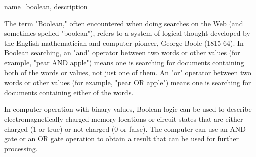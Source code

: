 {
    name=boolean,
    description={The term "Boolean," often encountered when doing searches on the Web (and sometimes spelled "boolean"), refers to a system of logical thought developed by the English mathematician and computer pioneer, George Boole (1815-64). In Boolean searching, an "and" operator between two words or other values (for example, "pear AND apple") means one is searching for documents containing both of the words or values, not just one of them. An "or" operator between two words or other values (for example, "pear OR apple") means one is searching for documents containing either of the words.

In computer operation with binary values, Boolean logic can be used to describe electromagnetically charged memory locations or circuit states that are either charged (1 or true) or not charged (0 or false). The computer can use an AND gate or an OR gate operation to obtain a result that can be used for further processing.}
}
